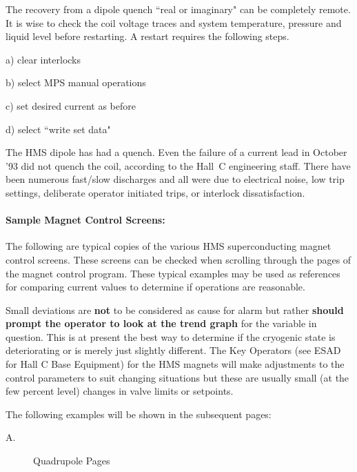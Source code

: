 {The recovery from a dipole quench ``real or imaginary" can be
completely remote.  It is wise to check the coil voltage traces and
system temperature, pressure and liquid level before restarting.  A
restart requires the following steps.


\begin{description}
\item{}\hskip0.5in a) clear interlocks
\item{}\hskip0.5in b) select MPS manual operations
\item{}\hskip0.5in c) set desired current as before
\item{}\hskip0.5in d) select ``write set data"
\end{description}


The HMS dipole has  had a quench.  Even the
failure of a current lead in October '93 did not quench the coil, 
according to the Hall~C engineering staff.  There
have been numerous fast/slow discharges and all were due to electrical
noise, low trip settings, deliberate operator initiated trips, or
interlock dissatisfaction.


\paragraph{Sample Magnet Control Screens:}

The following are typical copies of the various HMS superconducting magnet
control screens. These screens can be checked when scrolling through the pages
of the magnet control program. These typical examples may be used as
references for comparing current values to determine if operations are
reasonable.

Small deviations are {\bf not} to be considered as cause for alarm
but rather {\bf should prompt the operator to look at the trend graph} for the
variable in question. This is at present the best way to determine if the
cryogenic state is deteriorating or is merely just slightly different.
The Key Operators (see ESAD for Hall C Base Equipment)
for the HMS magnets will make adjustments to the control
parameters to suit changing situations but these are usually small (at the
few percent level) changes in valve limits or setpoints.

The following examples will be shown in the subsequent pages:


\begin{description}
\item[A.] {Quadrupole Pages}
\end{description}

}
